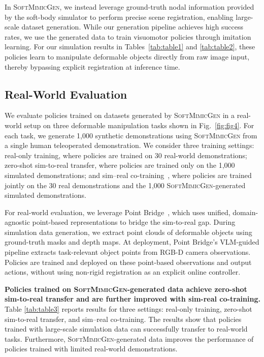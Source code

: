 \documentclass[letterpaper, 10 pt, conference]{ieeeconf}  %
\newcommand{\sysName}{\textsc{SoftMimicGen}\xspace}
\begin{document}
In \sysName, we instead leverage ground-truth nodal information provided by the soft-body simulator to perform precise scene registration, enabling large-scale dataset generation. While our generation pipeline achieves high success rates, we use the generated data to train visuomotor policies through imitation learning. For our simulation results in Tables~\ref{tab:table1} and \ref{tab:table2}, these policies learn to manipulate deformable objects directly from raw image input, thereby bypassing explicit registration at inference time.


\subsection{Real-World Evaluation}


We evaluate policies trained on datasets generated by \sysName in a real-world setup on three deformable manipulation tasks shown in Fig.~\ref{fig:fig4}. For each task, we generate 1,000 synthetic demonstrations using \sysName from a single human teleoperated demonstration. We consider three training settings: real-only training, where policies are trained on 30 real-world demonstrations; zero-shot sim-to-real transfer, where policies are trained only on the 1,000 simulated demonstrations; and sim–real co-training~\cite{maddukuri2025sim}, where policies are trained jointly on the 30 real demonstrations and the 1,000 \sysName-generated simulated demonstrations.


For real-world evaluation, we leverage Point Bridge~\cite{haldar2026point}, which uses unified, domain-agnostic point-based representations to bridge the sim-to-real gap. During simulation data generation, we extract point clouds of deformable objects using ground-truth masks and depth maps. At deployment, Point Bridge’s VLM-guided pipeline extracts task-relevant object points from RGB-D camera observations. Policies are trained and deployed on these point-based observations and output actions, without using non-rigid registration as an explicit online controller.





\textbf{Policies trained on \sysName-generated data achieve zero-shot sim-to-real transfer and are further improved with sim-real co-training.}
Table \ref{tab:table3} reports results for three settings: real-only training, zero-shot sim-to-real transfer, and sim–real co-training. The results show that policies trained with large-scale simulation data can successfully transfer to real-world tasks. Furthermore, \sysName-generated data improves the performance of policies trained with limited real-world demonstrations.
\end{document}
